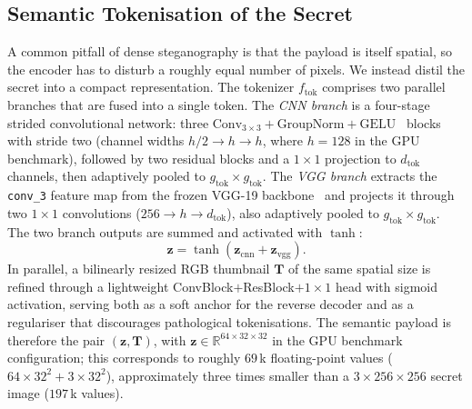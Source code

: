 \documentclass[conference]{IEEEtran}
\begin{document}
\subsection{Semantic Tokenisation of the Secret}
\label{sec:tok}
A common pitfall of dense steganography is that the payload is itself spatial, so the encoder has to disturb a roughly equal number of pixels. We instead distil the secret into a compact representation. The tokenizer $f_{\text{tok}}$ comprises two parallel branches that are fused into a single token. The \emph{CNN branch} is a four-stage strided convolutional network: three $\text{Conv}_{3{\times}3}{+}\text{GroupNorm}{+}\text{GELU}$~\cite{gelu} blocks with stride two (channel widths $h/2 \!\to\! h \!\to\! h$, where $h\!=\!128$ in the GPU benchmark), followed by two residual blocks and a $1\!\times\!1$ projection to $d_{\text{tok}}$ channels, then adaptively pooled to $g_{\text{tok}}\!\times\!g_{\text{tok}}$. The \emph{VGG branch} extracts the \texttt{conv\_3} feature map from the frozen VGG-19 backbone~\cite{vgg} and projects it through two $1\!\times\!1$ convolutions ($256 \!\to\! h \!\to\! d_{\text{tok}}$), also adaptively pooled to $g_{\text{tok}}\!\times\!g_{\text{tok}}$. The two branch outputs are summed and activated with $\tanh$:
\begin{equation}
    \mathbf{z} = \tanh\!\left(\mathbf{z}_{\text{cnn}} + \mathbf{z}_{\text{vgg}}\right).
    \label{eq:tok}
\end{equation}
In parallel, a bilinearly resized RGB thumbnail $\mathbf{T}$ of the same spatial size is refined through a lightweight ConvBlock$+$ResBlock$+1\!\times\!1$ head with sigmoid activation, serving both as a soft anchor for the reverse decoder and as a regulariser that discourages pathological tokenisations. The semantic payload is therefore the pair $(\mathbf{z},\mathbf{T})$, with $\mathbf{z}\!\in\!\mathbb{R}^{64\times32\times32}$ in the GPU benchmark configuration; this corresponds to roughly $69$\,k floating-point values ($64\!\times\!32^{2}+3\!\times\!32^{2}$), approximately three times smaller than a $3\!\times\!256\!\times\!256$ secret image ($197$\,k values).
\end{document}
